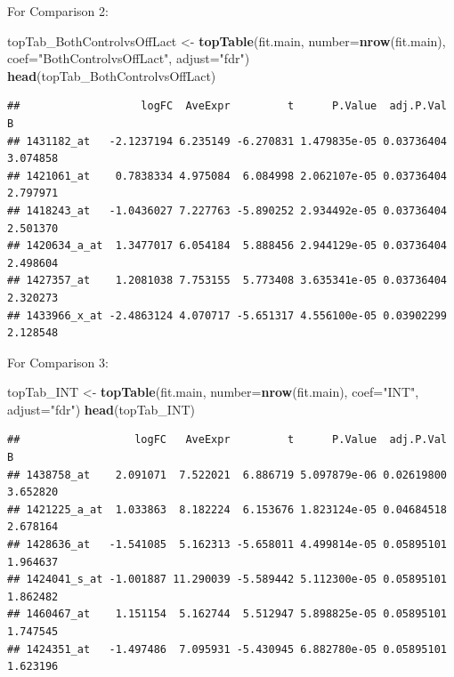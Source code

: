 \documentclass[]{article}
\newenvironment{Shaded}{\begin{snugshade}}{\end{snugshade}}
\newcommand{\KeywordTok}[1]{\textcolor[rgb]{0.13,0.29,0.53}{\textbf{#1}}}
\newcommand{\DataTypeTok}[1]{\textcolor[rgb]{0.13,0.29,0.53}{#1}}
\newcommand{\StringTok}[1]{\textcolor[rgb]{0.31,0.60,0.02}{#1}}
\newcommand{\NormalTok}[1]{#1}
\begin{document}
For Comparison 2:

\begin{Shaded}
\begin{Highlighting}[]
\NormalTok{topTab_BothControlvsOffLact <-}\StringTok{ }
\StringTok{  }\KeywordTok{topTable}\NormalTok{(fit.main, }
           \DataTypeTok{number=}\KeywordTok{nrow}\NormalTok{(fit.main), }
           \DataTypeTok{coef=}\StringTok{"BothControlvsOffLact"}\NormalTok{, }
           \DataTypeTok{adjust=}\StringTok{"fdr"}\NormalTok{) }
\KeywordTok{head}\NormalTok{(topTab_BothControlvsOffLact)}
\end{Highlighting}
\end{Shaded}

\begin{verbatim}
##                   logFC  AveExpr         t      P.Value  adj.P.Val        B
## 1431182_at   -2.1237194 6.235149 -6.270831 1.479835e-05 0.03736404 3.074858
## 1421061_at    0.7838334 4.975084  6.084998 2.062107e-05 0.03736404 2.797971
## 1418243_at   -1.0436027 7.227763 -5.890252 2.934492e-05 0.03736404 2.501370
## 1420634_a_at  1.3477017 6.054184  5.888456 2.944129e-05 0.03736404 2.498604
## 1427357_at    1.2081038 7.753155  5.773408 3.635341e-05 0.03736404 2.320273
## 1433966_x_at -2.4863124 4.070717 -5.651317 4.556100e-05 0.03902299 2.128548
\end{verbatim}

For Comparison 3:

\begin{Shaded}
\begin{Highlighting}[]
\NormalTok{topTab_INT <-}\StringTok{ }
\StringTok{  }\KeywordTok{topTable}\NormalTok{(fit.main, }
  \DataTypeTok{number=}\KeywordTok{nrow}\NormalTok{(fit.main), }
  \DataTypeTok{coef=}\StringTok{"INT"}\NormalTok{, }
  \DataTypeTok{adjust=}\StringTok{"fdr"}\NormalTok{) }
\KeywordTok{head}\NormalTok{(topTab_INT)}
\end{Highlighting}
\end{Shaded}

\begin{verbatim}
##                  logFC   AveExpr         t      P.Value  adj.P.Val        B
## 1438758_at    2.091071  7.522021  6.886719 5.097879e-06 0.02619800 3.652820
## 1421225_a_at  1.033863  8.182224  6.153676 1.823124e-05 0.04684518 2.678164
## 1428636_at   -1.541085  5.162313 -5.658011 4.499814e-05 0.05895101 1.964637
## 1424041_s_at -1.001887 11.290039 -5.589442 5.112300e-05 0.05895101 1.862482
## 1460467_at    1.151154  5.162744  5.512947 5.898825e-05 0.05895101 1.747545
## 1424351_at   -1.497486  7.095931 -5.430945 6.882780e-05 0.05895101 1.623196
\end{verbatim}
\end{document}

